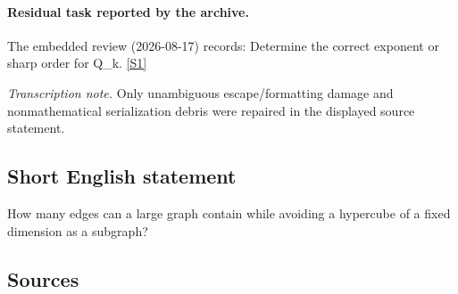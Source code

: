 \documentclass[11pt,a4paper]{article}
\newcommand{\sref}[2]{\hyperlink{source:#1:#2}{[S#2]}}
\begin{document}
\paragraph{Residual task reported by the archive.}

The embedded review (2026-08-17) records: Determine the correct exponent or sharp order for Q\_k. \sref{statement}{1}

{\small\emph{Transcription note.} Only unambiguous escape/formatting damage and nonmathematical serialization debris were repaired in the displayed source statement.}

\subsection{Short English statement}

How many edges can a large graph contain while avoiding a hypercube of a fixed dimension as a subgraph?

\subsection{Sources}
\end{document}
